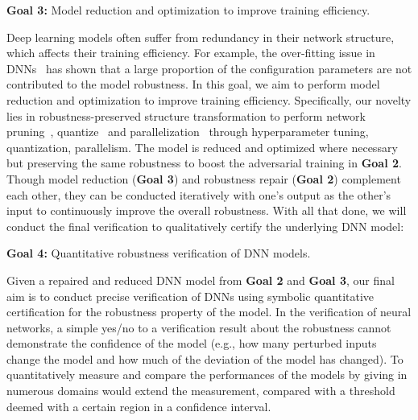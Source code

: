 \noindent
\begin{formal}
{\bf Goal 3:} Model reduction and optimization to  improve training efficiency.
\end{formal}
\noindent
Deep learning models often suffer from redundancy in their network structure, which affects their training efficiency. For example, the over-fitting issue in DNNs~\cite{denil2013predicting} has shown that a large proportion of the configuration parameters are not contributed to the model robustness. 
In this goal, we aim to perform model reduction and optimization to improve training efficiency. Specifically, our novelty lies in robustness-preserved structure transformation to perform network pruning~\cite{han2015learning,luo2017thinet}, quantize~\cite{ullrich2017soft} and parallelization~\cite{narayanan2019pipedream} through hyperparameter tuning, quantization, parallelism.
The model is reduced and optimized where necessary but preserving the same robustness to boost the adversarial training in \textbf{Goal 2}. Though model reduction (\textbf{Goal 3}) and robustness repair (\textbf{Goal 2}) complement each other, they can be conducted iteratively with one's output as the other's input to continuously improve the overall robustness.
With all that done, we will conduct the final verification to qualitatively certify the underlying DNN model: 
  \noindent
\begin{formal}
{\bf Goal 4:} Quantitative robustness verification of DNN models. 
\end{formal}
\noindent  
Given a repaired and reduced DNN model from \textbf{Goal 2} and \textbf{Goal 3}, our final aim is to conduct precise verification of DNNs using symbolic quantitative certification for the robustness property of the model. 
In the verification of neural networks, a simple yes/no to a verification result about the robustness cannot demonstrate the confidence of the model (e.g., how many perturbed inputs change the model and how much of the deviation of the model has changed). To quantitatively measure and compare the performances of the models by giving in numerous domains would extend the measurement, compared with a threshold deemed with a certain region in a confidence interval. 
